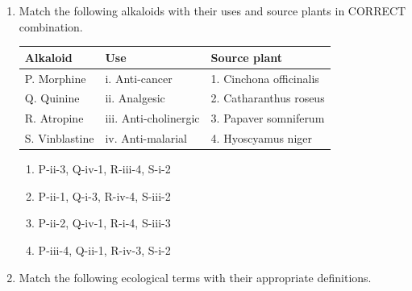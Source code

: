 \documentclass[journal,12pt,onecolumn]{IEEEtran}
\begin{document}
\begin{enumerate}[label=\arabic*.]
\item Match the following alkaloids with their uses and source plants in CORRECT combination.

\begin{tabular}{|l|l|l|}
\hline
Alkaloid      & Use                     & Source plant \\
\hline
P. Morphine   & i. Anti-cancer          & 1. Cinchona officinalis \\
Q. Quinine    & ii. Analgesic           & 2. Catharanthus roseus \\
R. Atropine   & iii. Anti-cholinergic   & 3. Papaver somniferum \\
S. Vinblastine & iv. Anti-malarial      & 4. Hyoscyamus niger \\
\hline
\end{tabular}
\begin{multicols}{2}
\begin{enumerate}[label=(\Alph*)]
    \item P-ii-3, Q-iv-1, R-iii-4, S-i-2
    \item P-ii-1, Q-i-3, R-iv-4, S-iii-2
    \item P-ii-2, Q-iv-1, R-i-4, S-iii-3
    \item P-iii-4, Q-ii-1, R-iv-3, S-i-2
\end{enumerate}
\end{multicols}
\item Match the following ecological terms with their appropriate definitions.


\end{enumerate}
\end{document}
